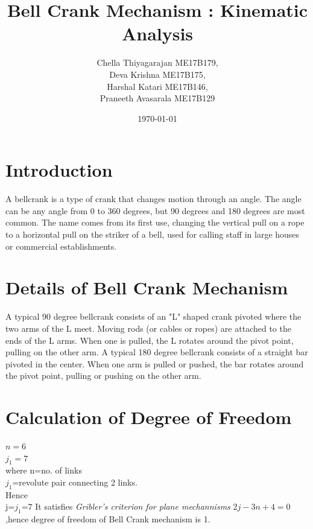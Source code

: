 \documentclass[12pt,a4paper]{article}
\begin{document}
	\title{Bell Crank Mechanism : Kinematic Analysis}
	\author{Chella Thiyagarajan ME17B179,\\Deva Krishna ME17B175,\\Harshal Katari ME17B146,\\Praneeth Avasarala ME17B129
	}
	\date{\today}
	\maketitle
	\tableofcontents
	\listoffigures
	\newpage
	\section{Introduction}
	A bellcrank is a type of crank that changes motion through an angle. The angle can be any angle from 0 to 360 degrees, but 90 degrees and 180 degrees are most common. The name comes from its first use, changing the vertical pull on a rope to a horizontal pull on the striker of a bell, used for calling staff in large houses or commercial establishments.
	\section{Details of Bell Crank Mechanism}
	\label{details}
	A typical 90 degree bellcrank consists of an "L" shaped crank pivoted where the two arms of the L meet. Moving rods (or cables or ropes) are attached to the ends of the L arms. When one is pulled, the L rotates around the pivot point, pulling on the other arm. A typical 180 degree bellcrank consists of a straight bar pivoted in the center. When one arm is pulled or pushed, the bar rotates around the pivot point, pulling or pushing on the other arm.
	\section{Calculation of Degree of Freedom}
	
	$n=6$\\
	$j_1=7$\\
	where n=no. of links\\
	$j_1$=revolute pair connecting 2 links.\\
	Hence \\
	j=$j_1$=$7$
	It satisfies \textit{Gribler's criterion for plane mechannisms} $2j-3n+4=0$,hence degree of freedom of Bell Crank mechanism is 1.
	
\end{document}

